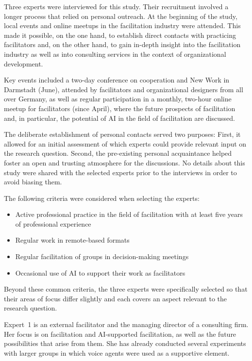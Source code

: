 Three experts were interviewed for this study. Their recruitment involved a longer process that relied on
personal outreach. At the beginning of the study, local events and online meetups in the facilitation
industry were attended. This made it possible, on the one hand, to establish direct contacts with practicing
facilitators and, on the other hand, to gain in-depth insight into the facilitation industry as well as into
consulting services in the context of organizational development.

Key events included a two-day conference on cooperation and New Work in Darmstadt (June), attended by
facilitators and organizational designers from all over Germany, as well as regular participation in a
monthly, two-hour online meetup for facilitators (since April), where the future prospects of facilitation
and, in particular, the potential of AI in the field of facilitation are discussed.

The deliberate establishment of personal contacts served two purposes: First, it allowed for an initial
assessment of which experts could provide relevant input on the research question. Second, the
pre-existing personal acquaintance helped foster an open and trusting atmosphere for the discussions. No
details about this study were shared with the selected experts prior to the interviews in order to avoid biasing them.

The following criteria were considered when selecting the experts:
\begin{itemize}{}
  \item Active professional practice in the field of facilitation with at least five years of professional experience
  \item Regular work in remote-based formats
  \item Regular facilitation of groups in decision-making meetings
  \item Occasional use of AI to support their work as facilitators
\end{itemize}

Beyond these common criteria, the three experts were specifically selected so that their areas of focus
differ slightly and each covers an aspect relevant to the research question.

Expert~1 is an external facilitator and the managing director of a consulting firm. Her focus is on
facilitation and AI-supported facilitation, as well as the future possibilities that arise from them. She has
already conducted several experiments with larger groups in which voice agents were used as a supportive element.

